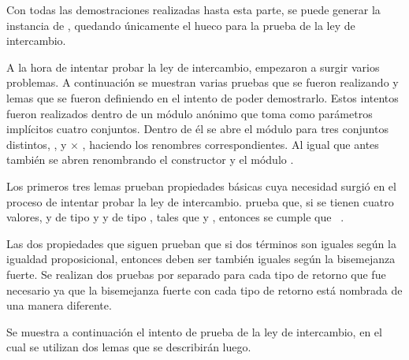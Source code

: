 \begin{AgdaAlign}
Con todas las demostraciones realizadas hasta esta parte, se puede generar la instancia de  \AgdaDatatype{$\_\bot$}, quedando únicamente el hueco para la prueba de la ley de intercambio. 


A la hora de intentar probar la ley de intercambio, empezaron a surgir varios problemas. A continuación se muestran varias pruebas que se fueron realizando y lemas que se fueron definiendo en el intento de poder demostrarlo. Estos intentos fueron realizados dentro de un módulo anónimo que toma como parámetros implícitos cuatro conjuntos. Dentro de él se abre el módulo  para tres conjuntos distintos, ,  y  $\times$ , haciendo los renombres correspondientes. Al igual que antes también se abren  renombrando el constructor  y el módulo .


Los primeros tres lemas prueban propiedades básicas cuya necesidad surgió en el proceso de intentar probar la ley de intercambio.  prueba que, si se tienen cuatro valores,  y  de tipo  \AgdaDatatype{$\bot$} y  y  de tipo  \AgdaDatatype{$\bot$}, tales que    y   , entonces se cumple que \hbox{  \AgdaFunction{$\gtrsim$}  }. 


Las dos propiedades que siguen prueban que si dos términos son iguales según la igualdad proposicional, entonces deben ser también iguales según la bisemejanza fuerte. Se realizan dos pruebas por separado para cada tipo de retorno que fue necesario ya que la bisemejanza fuerte con cada tipo de retorno está nombrada de una manera diferente. 


Se muestra a continuación el intento de prueba de la ley de intercambio, en el cual se utilizan dos lemas que se describirán luego. 


\end{AgdaAlign}
